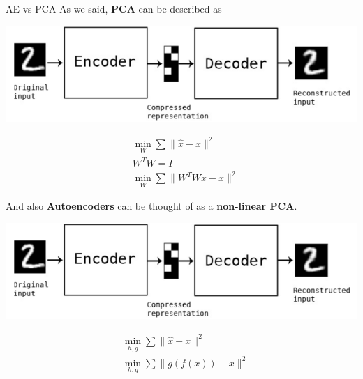 \documentclass[serif, aspectratio=169]{beamer}
\begin{document}
\begin{frame}{AE vs PCA}
    As we said, \textbf{PCA} can be described as
    \begin{center}
        \begin{minipage}{0.6\textwidth}
            \begin{center}
                \includegraphics[width=\textwidth]{pic/AE vs PCA 1.png}
            \end{center}
        \end{minipage}
        \hfill
        \begin{minipage}{0.35\textwidth}
            \begin{align*}
                &\min_{W} \sum \| \hat{x} - x \|^2 \\
                &W^T W = I \\
                &\min_{W} \sum \| W^T W x - x \|^2
            \end{align*}
        \end{minipage}
        
        \vspace{0.3cm}
    \end{center}
    And also \textbf{Autoencoders} can be thought of as a \textbf{non-linear PCA}.
    \begin{center}                
        \begin{minipage}{0.6\textwidth}
            \begin{center}
                \includegraphics[width=\textwidth]{pic/AE vs PCA 1.png} 
            \end{center}
        \end{minipage}
        \hfill
        \begin{minipage}{0.35\textwidth}
            \begin{align*}
                &\min_{h, g} \sum \| \hat{x} - x \|^2 \\
                &\min_{h, g} \sum \| g(f(x)) - x \|^2
            \end{align*}
        \end{minipage}
    \end{center}
\end{frame}
\end{document}
